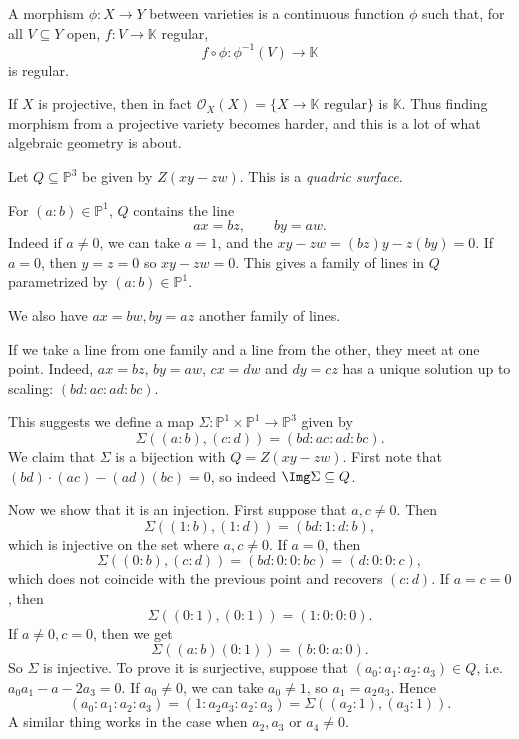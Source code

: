 \documentclass[12pt]{article}
\begin{document}
\begin{definition}
	A morphism $\phi : X \to Y$ between varieties is a continuous function $\phi$ such that, for all $V \subseteq Y$ open, $f : V \to \mathbb{K}$ regular,
	\[
	f \circ \phi : \phi^{-1}(V) \to \mathbb{K}
	\]
	is regular.
\end{definition}

\begin{remark}
	If $X$ is projective, then in fact $\mathcal{O}_X(X) = \{X \to \mathbb{K} \text{ regular}\}$ is $\mathbb{K}$. Thus finding morphism from a projective variety becomes harder, and this is a lot of what algebraic geometry is about.
\end{remark}

\begin{exbox}
	Let $Q \subseteq \mathbb{P}^3$ be given by $Z(xy - zw)$. This is a \emph{quadric surface}.

	For $(a : b) \in \mathbb{P}^1$, $Q$ contains the line
	\[
	ax = bz, \qquad by = aw.
	\]
	Indeed if $a \neq 0$, we can take $a = 1$, and the $xy - zw = (bz)y - z(by) = 0$. If $a = 0$, then $y = z = 0$ so $xy - zw = 0$. This gives a family of lines in $Q$ parametrized by $(a : b) \in \mathbb{P}^1$.

	We also have $ax = bw, by = az$ another family of lines.

	If we take a line from one family and a line from the other, they meet at one point. Indeed, $ax =  bz$, $by = aw$, $cx = dw$ and $dy = cz$ has a unique solution up to scaling: $(bd : ac : ad : bc)$.

	This suggests we define a map $\Sigma : \mathbb{P}^1 \times \mathbb{P}^1 \to \mathbb{P}^3$ given by
	\[
	\Sigma((a:b), (c:d)) = (bd:ac:ad:bc).
	\]
	We claim that $\Sigma$ is a bijection with $Q = Z(xy - zw)$. First note that $(bd) \cdot (ac) - (ad)(bc) = 0$, so indeed $\Img \Sigma \subseteq Q$.

	Now we show that it is an injection. First suppose that $a, c \neq 0$. Then
	\[
	\Sigma((1:b), (1:d)) = (bd : 1 : d : b),
	\]
	which is injective on the set where $a, c \neq 0$. If $a = 0$, then
	\[
	\Sigma((0:b), (c:d)) = (bd : 0 : 0 : bc) = (d : 0 : 0 : c),
	\]
	which does not coincide with the previous point and recovers $(c:d)$. If $a = c = 0$, then
	\[
	\Sigma((0:1),(0:1)) = (1:0:0:0).
	\]
	If $a \neq 0, c = 0$, then we get
	\[
	\Sigma((a:b)(0:1)) = (b:0:a:0).
	\]
	So $\Sigma$ is injective. To prove it is surjective, suppose that $(a_0 : a_1 : a_2 : a_3) \in Q$, i.e. $a_0 a_1 - a-2a_3 = 0$. If $a_0 \neq 0$, we can take $a_0 \neq 1$, so $a_1 = a_2 a_3$. Hence
	\[
		(a_0 : a_1 : a_2 : a_3) = (1 : a_2 a_3 : a_2 : a_3) = \Sigma((a_2 : 1), (a_3 : 1)).
	\]
	A similar thing works in the case when $a_2, a_3$ or $a_4 \neq 0$.
\end{exbox}
\end{document}
